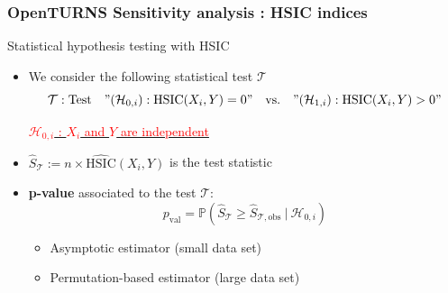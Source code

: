 \documentclass{beamer}
\begin{document}
\begin{frame}
\frametitle{OpenTURNS Sensitivity analysis : HSIC indices}

\small

\begin{block}{Statistical hypothesis testing with HSIC}
\begin{itemize}
\item We consider the following statistical test $\mathcal{T}$
\small
\begin{equation*}
\mathcal{T}: \textrm{Test}\quad "(\mathcal{H}_{0,i}):\mathrm{HSIC}(X_i,Y) = 0"\quad\textrm{vs.}\quad "(\mathcal{H}_{1,i}):\mathrm{HSIC}(X_i,Y) > 0"
\end{equation*}

\underline{\textcolor{red}{$\mathcal{H}_{0,i}$ : $X_i$ and $Y$ are independent}}

\normalsize
\item  $\widehat{S}_{\mathcal{T}} := n \times \widehat{\mathrm{HSIC}}(X_i,Y)$ is the test statistic

\item \textbf{p-value} associated to the test $\mathcal{T}$:
\begin{equation*}
p_{\textrm{val}} = \mathbb{P}\left(\widehat{S}_{\mathcal{T}} \geq \widehat{S}_{\mathcal{T},\textrm{obs}}~|~\mathcal{H}_{0,i}\right)
\end{equation*}
\vspace{-10pt}
\begin{itemize}
\item Asymptotic estimator (small data set)
\item Permutation-based estimator (large data set)
\end{itemize}
\end{itemize}
\end{block}

\end{frame}
  
  
  
  
\end{document}
